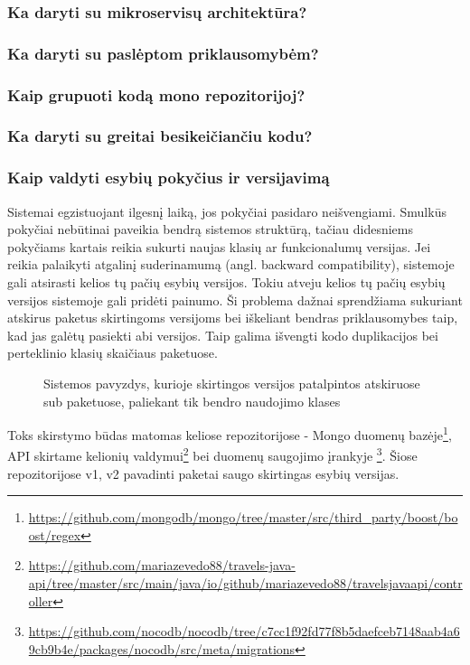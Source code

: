 \subsubsection{Ka daryti su mikroservisų architektūra?}
\subsubsection{Ka daryti su paslėptom priklausomybėm?}
\subsubsection{Kaip grupuoti kodą mono repozitorijoj?}
\subsubsection{Ka daryti su greitai besikeičiančiu kodu?}
\subsubsection{Kaip valdyti esybių pokyčius ir versijavimą}
Sistemai egzistuojant ilgesnį laiką, jos pokyčiai pasidaro neišvengiami. Smulkūs pokyčiai nebūtinai paveikia bendrą sistemos struktūrą, tačiau
didesniems pokyčiams kartais reikia sukurti naujas klasių ar funkcionalumų versijas. Jei reikia palaikyti atgalinį
suderinamumą (angl. backward compatibility), sistemoje gali atsirasti kelios tų pačių esybių versijos.
Tokiu atveju kelios tų pačių esybių versijos sistemoje gali pridėti painumo. Ši problema dažnai sprendžiama sukuriant atskirus paketus skirtingoms
versijoms bei iškeliant bendras priklausomybes taip, kad jas galėtų pasiekti abi versijos. Taip galima išvengti kodo duplikacijos bei perteklinio
klasių skaičiaus paketuose.
\begin{figure}[H]
    \snugshade
    \endsnugshade
    \caption{Sistemos pavyzdys, kurioje skirtingos versijos patalpintos atskiruose sub paketuose, paliekant tik bendro naudojimo klases}
\end{figure}
Toks skirstymo būdas matomas keliose repozitorijose - Mongo duomenų bazėje\footnote{\url{https://github.com/mongodb/mongo/tree/master/src/third_party/boost/boost/regex}},
API skirtame kelionių valdymui\footnote{\url{https://github.com/mariazevedo88/travels-java-api/tree/master/src/main/java/io/github/mariazevedo88/travelsjavaapi/controller}}
 bei duomenų saugojimo įrankyje \footnote{\url{https://github.com/nocodb/nocodb/tree/c7cc1f92fd77f8b5daefceb7148aab4a69cb9b4e/packages/nocodb/src/meta/migrations}}.
Šiose repozitorijose v1, v2 pavadinti paketai saugo skirtingas esybių versijas.






